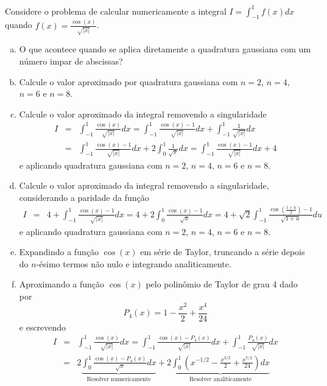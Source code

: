 \begin{exer} Considere o problema de calcular numericamente a integral $I=\int_{-1}^1f(x)dx$ quando $f(x)=\frac{\cos(x)}{\sqrt{|x|}}$.
\begin{enumerate}[a)]
\item O que acontece quando se aplica diretamente a quadratura gaussiana com um número impar de abscissas?
\item Calcule o valor aproximado por quadratura gaussiana com $n=2$, $n=4$, $n=6$ e $n=8$.
\item Calcule o valor aproximado da integral removendo a singularidade
\begin{eqnarray*}
I&=&\int_{-1}^1\frac{\cos(x)}{\sqrt{|x|}}dx=\int_{-1}^1\frac{\cos(x)-1}{\sqrt{|x|}}dx+\int_{-1}^1\frac{1}{\sqrt{|x|}}dx \\
&=&\int_{-1}^1\frac{\cos(x)-1}{\sqrt{|x|}}dx+2\int_{0}^1\frac{1}{\sqrt{x}}dx=\int_{-1}^1\frac{\cos(x)-1}{\sqrt{|x|}}dx+4
\end{eqnarray*}
e aplicando quadratura gaussiana com $n=2$, $n=4$, $n=6$ e $n=8$.
\item Calcule o valor aproximado da integral removendo a singularidade, considerando a paridade da função
\begin{eqnarray*}
I&=&4+\int_{-1}^1\frac{\cos(x)-1}{\sqrt{|x|}}dx=4+2\int_{0}^1\frac{\cos(x)-1}{\sqrt{x}}dx=4+\sqrt{2}\int_{-1}^1\frac{\cos\left(\frac{1+u}{2}\right)-1}{\sqrt{1+u}}du
\end{eqnarray*}
e aplicando quadratura gaussiana com $n=2$, $n=4$, $n=6$ e $n=8$.
\item Expandindo a função $\cos(x)$ em série de Taylor, truncando a série depois  do $n$-ésimo  termos não nulo e integrando analiticamente. \\
\item Aproximando a função $\cos(x)$ pelo polinômio de Taylor  de grau 4 dado por $$P_4(x)=1-\frac{x^2}{2}+\frac{x^4}{24}$$
e escrevendo
\begin{eqnarray*}I&=&\int_{-1}^1\frac{\cos(x)}{\sqrt{|x|}}dx=\int_{-1}^1\frac{\cos(x)-P_4(x)}{\sqrt{|x|}}dx+\int_{-1}^1\frac{P_4(x)}{\sqrt{|x|}}dx\\
&=&2\underbrace{\int_{0}^1\frac{\cos(x)-P_4(x)}{\sqrt{x}}dx}_{\text{Resolver numericamente}}+2\underbrace{\int_{0}^1\left(x^{-1/2}-\frac{x^{3/2}}{2}+\frac{x^{7/2}}{24}\right)dx}_{\text{Resolver analiticamente}}
\end{eqnarray*}
\end{enumerate}
\end{exer}
